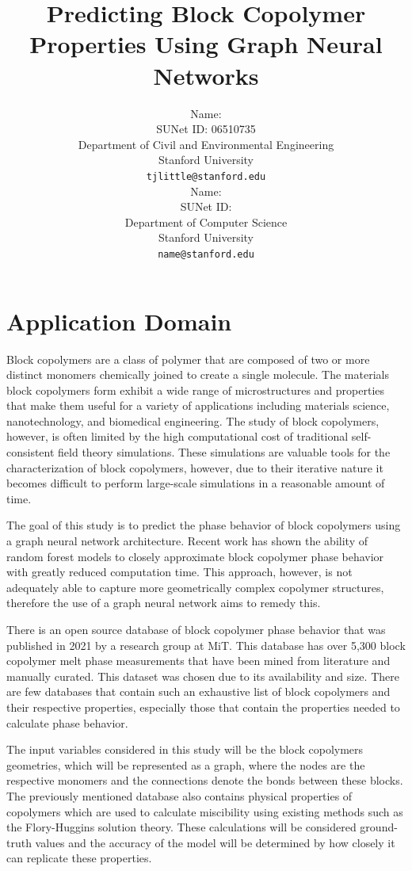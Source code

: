 \documentclass{article}
\title{
  Predicting Block Copolymer Properties Using Graph Neural Networks \\
}
\author{
  Name: \\
  SUNet ID: 06510735\\
  Department of Civil and Environmental Engineering \\
  Stanford University \\
  \texttt{tjlittle@stanford.edu} \\
  \And
  Name: \\
  SUNet ID: \\
  Department of Computer Science \\
  Stanford University \\
  \texttt{name@stanford.edu} \\
}
\begin{document}
\maketitle



\section{Application Domain}
Block copolymers are a class of polymer that are composed of two or more distinct monomers chemically joined to create a single molecule. The materials block copolymers form exhibit a wide range of microstructures and properties that make them useful for a variety of applications including materials science, nanotechnology, and biomedical engineering. The study of block copolymers, however, is often limited by the high computational cost of traditional self-consistent field theory simulations. These simulations are valuable tools for the characterization of block copolymers, however, due to their iterative nature it becomes difficult to perform large-scale simulations in a reasonable amount of time.

The goal of this study is to predict the phase behavior of block copolymers using a graph neural network architecture. Recent work has shown the ability of random forest models to closely approximate block copolymer phase behavior with greatly reduced computation time\cite{RandForest}. This approach, however, is not adequately able to capture more geometrically complex copolymer structures, therefore the use of a graph neural network aims to remedy this.

There is an open source database of block copolymer phase behavior that was published in 2021 by a research group at MiT\cite{BCDB}. This database has over 5,300 block copolymer melt phase measurements that have been mined from literature and manually curated. This dataset was chosen due to its availability and size. There are few databases that contain such an exhaustive list of block copolymers and their respective properties, especially those that contain the properties needed to calculate phase behavior.

The input variables considered in this study will be the block copolymers geometries, which will be represented as a graph, where the nodes are the respective monomers and the connections denote the bonds between these blocks. The previously mentioned database also contains physical properties of copolymers which are used to calculate miscibility using existing methods such as the Flory-Huggins solution theory. These calculations will be considered ground-truth values and the accuracy of the model will be determined by how closely it can replicate these properties.
\end{document}
